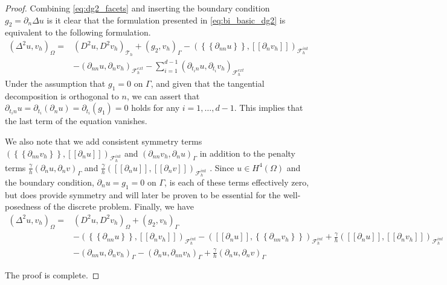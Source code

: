 \documentclass[11pt]{article}
\theoremstyle{remark}
\newcommand{\mean}[1]{\left\{\!\!\left\{#1\right\}\!\!\right\}}
\newcommand{\jump}[1]{\left[\!\left[ #1 \right]\!\right]}
\numberwithin{equation}{section}
\begin{document}
\begin{proof}
Combining \eqref{eq:dg2_facets} and inserting the boundary condition $g_{2} = \partial _{n} \Delta u $ is it clear that the formulation presented in \eqref{eq:bi_basic_dg2} is equivalent to the following formulation.
\begin{equation}
\label{eq:bi_basic_dg_full_1}
\begin{split}
    \left( \Delta  ^{2} u, v_h \right) _{\Omega }  =&   \left( D^2u, D^2v_h \right)_{\mathcal{T} _{h}} +  \left(g_{2}, v_h  \right) _{\Gamma  }  -  ( \mean{ \partial _{nn} u }   , \jump{ \partial_{n} v_h } )_{\mathcal{F}_{h}^{int} } \\
                                                  &  - ( \partial _{nn} u , \partial _{n} v_h)_{\mathcal{F}^{ext}_{h} } - \sum_{i =1  }^{d-1} ( \partial   _{t_{i}n} u  ,  \partial   _{t_{i}}  v_h  )_{ \mathcal{F}^{ext} _{h}  }
\end{split}
\end{equation}
Under the assumption that $g_{1} = 0$ on $\Gamma$, and given that the tangential decomposition is orthogonal to $n$, we can assert that $ \partial_{t_{i} n} u = \partial_{t_{i}} ( \partial _{n} u )= \partial_{t_{i}} ( g_{1} ) = 0 $ holds for any $i =
1,\ldots, d -1$. This implies that the
last term of the equation vanishes.

We also note that we add consistent symmetry terms $( \mean{ \partial _{nn} v_h } ,\jump{ \partial _{n} u }    )_{\mathcal{F}^{int}_{h} } $ and $( \partial _{nn} v_h  , \partial _{n} u     )_{\Gamma  } $ in addition to the penalty terms $\frac{\gamma
}{h} ( \partial _{n} u, \partial _{n}v)_{\Gamma }  $ and $\frac{\gamma
}{h} ( \jump{ \partial _{n} u }  , \jump{    \partial _{n}v})_{\mathcal{F}^{int}_{h} }  $ . Since $u\in H^{4}( \Omega ) $ and the boundary condition,  $\partial _{n} u = g_{1}=0$ on $\Gamma $, is each of these terms effectively zero, but does provide symmetry and will later
be proven to be essential for the well-posedness of the discrete problem. Finally, we have
\begin{equation}
\begin{split}
    \left( \Delta  ^{2} u, v_h \right) _{\Omega }  =&   \left( D^2u, D^2v_h \right)_{\Omega } + \left(g_{2}, v_h  \right) _{ \Gamma  }\\
    &    -  ( \mean{ \partial _{nn} u }   , \jump{ \partial_{n} v_h } )_{\mathcal{F}_{h}^{int} } -  (  \jump{ \partial_{n} u
    },\mean{ \partial _{nn} v_h } )_{\mathcal{F}_{h}^{int} } + \frac{\gamma }{h}  (  \jump{ \partial_{n} u },\jump{ \partial _{n} v_h } )_{\mathcal{F}_{h}^{int} } \\
    & - ( \partial _{nn} u , \partial _{n} v_h)_{\Gamma  } - (\partial _{n} u, \partial _{nn} v_h )_{\Gamma  }  + \frac{\gamma }{h}  \left(  \partial _{n} u,  \partial _{n} v      \right)_{\Gamma }
\end{split}
\end{equation}

The proof is complete.

\end{proof}
\end{document}
